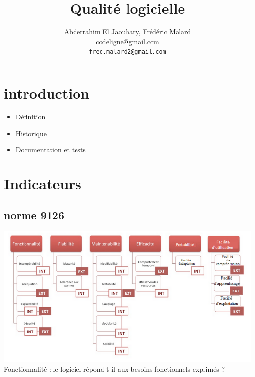 \documentclass[french]{beamer}%
\title{Qualité logicielle}
\author[Abderrahim El Jaouhary, Frédéric Malard]
{
	Abderrahim El Jaouhary, Frédéric Malard \\\medskip
	{\small \nolinkurl{}{codeligne@gmail.com}} \\ 
	{\small \nolinkurl{fred.malard2@gmail.com}}
}
\begin{document}
	
	\begin{frame}
		\titlepage
	\end{frame}
	
	\begin{frame}[shrink]{\secname}
	    \tableofcontents[subsectionstyle=hide]
	\end{frame}
	
	\section{introduction}
		
		\begin{frame}
			\begin{itemize}
			    \item Définition
			    \item Historique
			    \item Documentation et tests
			\end{itemize}
		\end{frame}
		
	\section{Indicateurs}
		
		\subsection{norme 9126}
		
			\begin{frame}
				\includegraphics[scale = 0.4]{indicateurs.jpg}
				\newline
				Fonctionnalité : le logiciel répond t-il aux besoins fonctionnels exprimés ?
			\end{frame}
			
\end{document}
